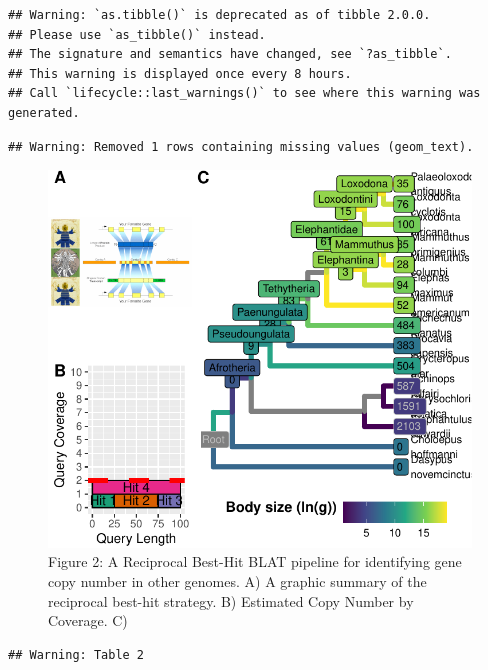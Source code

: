 \documentclass[10pt,letterpaper]{article}
\begin{document}
\begin{verbatim}
## Warning: `as.tibble()` is deprecated as of tibble 2.0.0.
## Please use `as_tibble()` instead.
## The signature and semantics have changed, see `?as_tibble`.
## This warning is displayed once every 8 hours.
## Call `lifecycle::last_warnings()` to see where this warning was generated.
\end{verbatim}

\begin{verbatim}
## Warning: Removed 1 rows containing missing values (geom_text).
\end{verbatim}

\begin{figure}
\centering
\includegraphics{paper_PLOS_draft_files/figure-latex/Figure 2-1.pdf}
\caption{Figure 2: A Reciprocal Best-Hit BLAT pipeline for identifying
gene copy number in other genomes. A) A graphic summary of the
reciprocal best-hit strategy. B) Estimated Copy Number by Coverage. C)}
\end{figure}

\begin{verbatim}
## Warning: Table 2
\end{verbatim}
\end{document}
